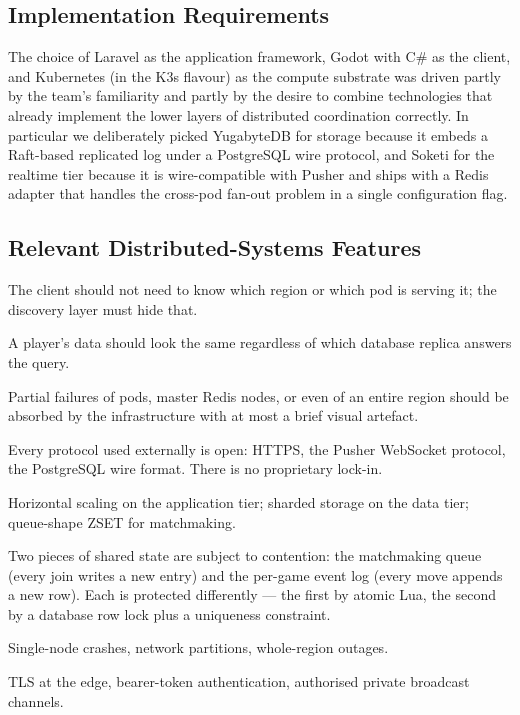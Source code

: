 \documentclass{scrartcl}
\begin{document}
\subsection{Implementation Requirements}

The choice of Laravel as the application framework, Godot with C\# as
the client, and Kubernetes (in the K3s flavour) as the compute substrate
was driven partly by the team's familiarity and partly by the desire to
combine technologies that already implement the lower layers of
distributed coordination correctly. In particular we deliberately picked
YugabyteDB for storage because it embeds a Raft-based replicated log
under a PostgreSQL wire protocol, and Soketi for the realtime tier
because it is wire-compatible with Pusher and ships with a Redis adapter
that handles the cross-pod fan-out problem in a single configuration
flag. 

\subsection{Relevant Distributed-Systems Features}

\begin{description}[leftmargin=1.6em]
  \item[Location transparency.] The client should not need to know which
  region or which pod is serving it; the discovery layer must hide that.
  \item[Replication transparency.] A player's data should look the same
  regardless of which database replica answers the query.
  \item[Failure transparency.] Partial failures of pods, master Redis
  nodes, or even of an entire region should be absorbed by the
  infrastructure with at most a brief visual artefact.
  \item[Openness.] Every protocol used externally is open: HTTPS, the
  Pusher WebSocket protocol, the PostgreSQL wire format. There is no
  proprietary lock-in.
  \item[Scalability.] Horizontal scaling on the application tier; sharded
  storage on the data tier; queue-shape ZSET for matchmaking.
  \item[Concurrency control.] Two pieces of shared state are subject to
  contention: the matchmaking queue (every join writes a new entry) and
  the per-game event log (every move appends a new row). Each is
  protected differently --- the first by atomic Lua, the second by a
  database row lock plus a uniqueness constraint.
  \item[Fault tolerance.] Single-node crashes, network partitions,
  whole-region outages.
  \item[Security.] TLS at the edge, bearer-token authentication,
  authorised private broadcast channels.
\end{description}
\end{document}
